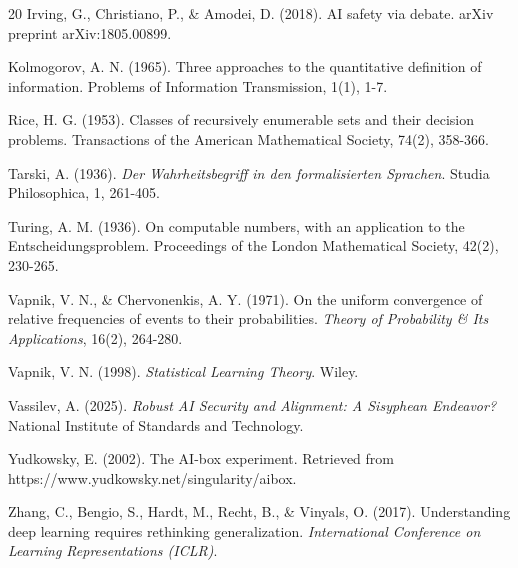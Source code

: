 \documentclass[11pt,twoside,letterpaper]{article}
\begin{document}
\begin{thebibliography}{20}
Irving, G., Christiano, P., \& Amodei, D. (2018). AI safety via debate. arXiv preprint arXiv:1805.00899.

Kolmogorov, A. N. (1965). Three approaches to the quantitative definition of information. Problems of Information Transmission, 1(1), 1-7.

Rice, H. G. (1953). Classes of recursively enumerable sets and their decision problems. Transactions of the American Mathematical Society, 74(2), 358-366.

Tarski, A. (1936). \textit{Der Wahrheitsbegriff in den formalisierten Sprachen}. Studia Philosophica, 1, 261-405.

Turing, A. M. (1936). On computable numbers, with an application to the Entscheidungsproblem. Proceedings of the London Mathematical Society, 42(2), 230-265.

Vapnik, V. N., \& Chervonenkis, A. Y. (1971). On the uniform convergence of relative frequencies of events to their probabilities. \textit{Theory of Probability \& Its Applications}, 16(2), 264-280.

Vapnik, V. N. (1998). \textit{Statistical Learning Theory}. Wiley.

Vassilev, A. (2025). \textit{Robust AI Security and Alignment: A Sisyphean Endeavor?} National Institute of Standards and Technology.

Yudkowsky, E. (2002). The AI-box experiment. Retrieved from https://www.yudkowsky.net/singularity/aibox.

Zhang, C., Bengio, S., Hardt, M., Recht, B., \& Vinyals, O. (2017). Understanding deep learning requires rethinking generalization. \textit{International Conference on Learning Representations (ICLR)}.

\end{thebibliography}
\end{document}
